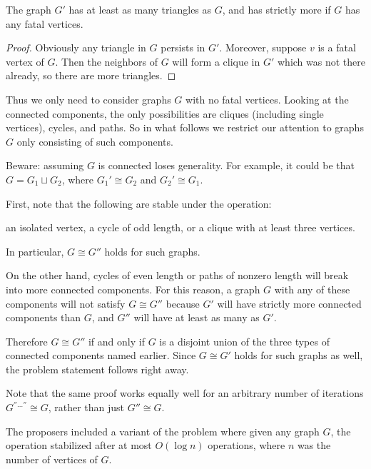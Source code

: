 \documentclass[11pt]{scrartcl}
\begin{document}
\begin{claim*}
  The graph $G'$ has at least as many triangles as $G$,
  and has strictly more if $G$ has any fatal vertices.
\end{claim*}
\begin{proof}
  Obviously any triangle in $G$ persists in $G'$.
  Moreover, suppose $v$ is a fatal vertex of $G$.
  Then the neighbors of $G$ will form a clique in $G'$
  which was not there already,
  so there are more triangles.
\end{proof}

Thus we only need to consider graphs $G$ with no fatal vertices.
Looking at the connected components,
the only possibilities are cliques
(including single vertices), cycles, and paths.
So in what follows we restrict our attention to graphs $G$
only consisting of such components.

\begin{remark*}
  [Warning]
  Beware: assuming $G$ is connected loses generality.
  For example, it could be that $G = G_1 \sqcup G_2$,
  where $G_1' \cong G_2$ and $G_2' \cong G_1$.
\end{remark*}

First, note that the following are stable under the operation:
\begin{itemize}
  \ii an isolated vertex,
  \ii a cycle of odd length, or
  \ii a clique with at least three vertices.
\end{itemize}
In particular, $G \cong G''$ holds for such graphs.

On the other hand, cycles of even length or paths of nonzero
length will break into more connected components.
For this reason, a graph $G$ with any of these components
will not satisfy $G \cong G''$
because $G'$ will have strictly more connected components than $G$,
and $G''$ will have at least as many as $G'$.

Therefore $G \cong G''$ if and only if $G$
is a disjoint union of the three types of connected components named earlier.
Since $G \cong G'$ holds for such graphs as well,
the problem statement follows right away.

\begin{remark*}
  Note that the same proof works equally well
  for an arbitrary number of iterations $G^{''\dots''} \cong G$,
  rather than just $G'' \cong G$.
\end{remark*}

\begin{remark*}
  The proposers included a variant of the problem where given any graph $G$,
  the operation stabilized after at most $O(\log n)$ operations,
  where $n$ was the number of vertices of $G$.
\end{remark*}
\pagebreak
\end{document}
